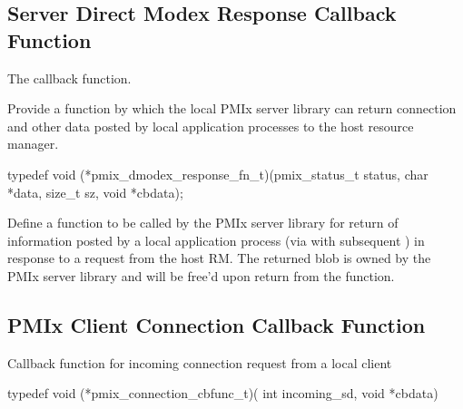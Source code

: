 \subsection{Server Direct Modex Response Callback Function}

The  callback function.

\summary

Provide a function by which the local \ac{PMIx} server library can return connection and other data posted by local application processes to the host resource manager.

\format

\cspecificstart
\begin{codepar}
typedef void (*pmix_dmodex_response_fn_t)(pmix_status_t status,
                        char *data, size_t sz,
                        void *cbdata);
\end{codepar}
\cspecificend


\begin{arglist}
\end{arglist}


\descr
Define a function to be called by the PMIx server library for return of information posted by a local application process (via  with subsequent ) in response to a request from the host RM. The returned  blob is owned by the PMIx server library and will be free’d upon return from the function.

\subsection{PMIx Client Connection Callback Function}

\summary

Callback function for incoming connection request from a local client

\format

\cspecificstart
\begin{codepar}
typedef void (*pmix_connection_cbfunc_t)(
                             int incoming_sd, void *cbdata)
\end{codepar}
\cspecificend

